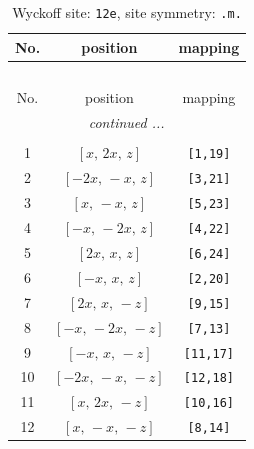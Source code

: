\documentclass[fleqn,8pt]{jsarticle}
\begin{document}
\begin{longtable}{ccc}
\caption{Wyckoff site: {\tt 12e}, site symmetry: {\tt .m.}}
 \\
 \hline \hline
No. & position & mapping \\ \hline \endfirsthead

\multicolumn{2}{l}{\tablename\ \thetable{}} \\
 \hline \hline
No. & position & mapping \\ \hline \endhead

 \hline \hline
\multicolumn{2}{r}{\footnotesize\it continued ...} \\ \endfoot

 \hline \hline
\multicolumn{2}{r}{} \\ \endlastfoot

1 & $\left[ x,\, 2 x,\, z \right]$ & {\tt [1,19]} \\ \hline
2 & $\left[ - 2 x,\, - x,\, z \right]$ & {\tt [3,21]} \\ \hline
3 & $\left[ x,\, - x,\, z \right]$ & {\tt [5,23]} \\ \hline
4 & $\left[ - x,\, - 2 x,\, z \right]$ & {\tt [4,22]} \\ \hline
5 & $\left[ 2 x,\, x,\, z \right]$ & {\tt [6,24]} \\ \hline
6 & $\left[ - x,\, x,\, z \right]$ & {\tt [2,20]} \\ \hline
7 & $\left[ 2 x,\, x,\, - z \right]$ & {\tt [9,15]} \\ \hline
8 & $\left[ - x,\, - 2 x,\, - z \right]$ & {\tt [7,13]} \\ \hline
9 & $\left[ - x,\, x,\, - z \right]$ & {\tt [11,17]} \\ \hline
10 & $\left[ - 2 x,\, - x,\, - z \right]$ & {\tt [12,18]} \\ \hline
11 & $\left[ x,\, 2 x,\, - z \right]$ & {\tt [10,16]} \\ \hline
12 & $\left[ x,\, - x,\, - z \right]$ & {\tt [8,14]} \\
\end{longtable}
\renewcommand{\arraystretch}{1.2}
\end{document}

